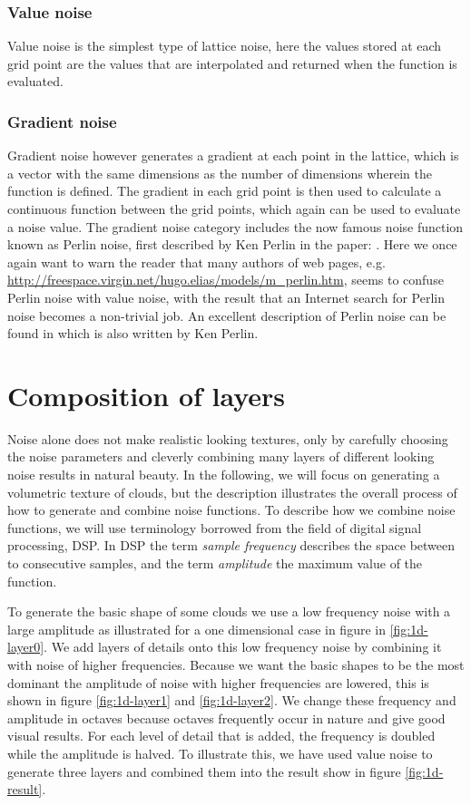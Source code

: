 \subsubsection{Value noise}
Value noise is the simplest type of lattice noise, here the values
stored at each grid point are the values that are interpolated and
returned when the function is evaluated.

\subsubsection{Gradient noise}
Gradient noise however generates a gradient at each point in the
lattice, which is a vector with the same dimensions as the number of
dimensions wherein the function is defined. The gradient in each grid
point is then used to calculate a continuous function between the grid
points, which again can be used to evaluate a noise value.
%
The gradient noise category includes the now famous noise
function known as Perlin noise, first described by Ken Perlin in
the paper: .
%
Here we once again want to warn the reader that many authors of web
pages,
e.g. \url{http://freespace.virgin.net/hugo.elias/models/m_perlin.htm},
seems to confuse Perlin noise with value noise, with the result that
an Internet search for Perlin noise becomes a non-trivial job. An
excellent description of Perlin noise can be found in
 which is also written by Ken Perlin.

\section{Composition of layers}
Noise alone does not make realistic looking textures, only by carefully
choosing the noise parameters and cleverly combining many layers of
different looking noise results in natural beauty. In the following,
we will focus on generating a volumetric texture of clouds, but the
description illustrates the overall process of how to generate and
combine noise functions.
%
To describe how we combine noise functions, we will use terminology
borrowed from the field of digital signal processing, DSP. In DSP the
term \emph{sample frequency} describes the space between to
consecutive samples, and the term \emph{amplitude} the maximum value
of the function.

To generate the basic shape of some clouds we use a low
frequency noise with a large amplitude as illustrated for a one
dimensional case in figure in \ref{fig:1d-layer0}.
%
We add layers of details onto this low frequency noise by combining it 
with noise of higher frequencies.
Because we want the basic shapes to be the most
dominant the amplitude of noise with higher frequencies are lowered,
this is shown in figure \ref{fig:1d-layer1} and \ref{fig:1d-layer2}.
%
We change these frequency and amplitude in octaves because octaves
frequently occur in nature and give good visual results.  For each
level of detail that is added, the frequency is doubled while the
amplitude is halved. To illustrate this, we have used value noise to
generate three layers and combined them into the result show in figure
\ref{fig:1d-result}.

